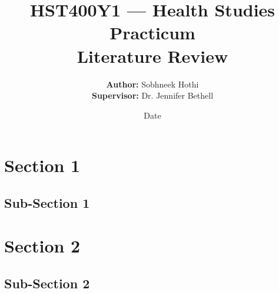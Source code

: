 \documentclass[letterpaper,12pt]{article}
\begin{document}
\title{HST400Y1 — Health Studies Practicum \\\textbf{Literature Review}}
\author{\textbf{Author:} Sobhneek Hothi \\
\textbf{Supervisor:} Dr. Jennifer Bethell}
\date{Date}
\maketitle
\tableofcontents
\newpage

\section{Section 1}

\subsection{Sub-Section 1}

\section{Section 2}

\subsection{Sub-Section 2}
\end{document}
